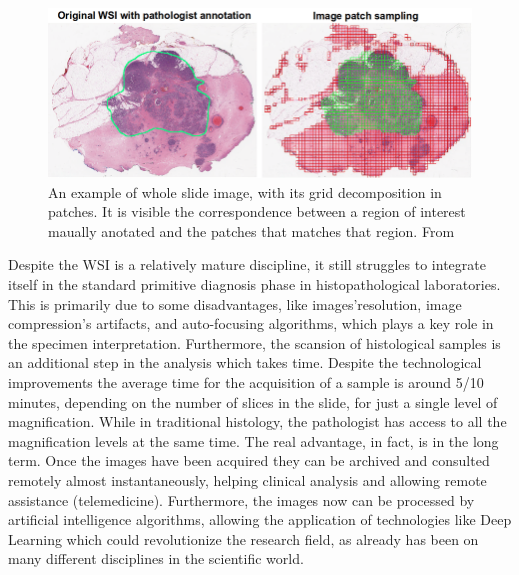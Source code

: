     \begin{figure}
        \centering
        \includegraphics[width = \textwidth]{images/patches_grid}
        \caption{An example of whole slide image, with its grid decomposition in patches. It is visible the correspondence between a region of interest maually anotated and the patches that matches that region. From \cite{WSI_grid}}
        \label{fig:patches_grid}
    \end{figure}

    Despite the WSI is a relatively mature discipline, it still struggles to integrate itself in the standard primitive diagnosis phase in histopathological laboratories. This is primarily due to some disadvantages, like images'resolution, image compression's artifacts, and auto-focusing algorithms, which plays a key role in the specimen interpretation. Furthermore, the scansion of histological samples is an additional step in the analysis which takes time. Despite the technological improvements the average time for the acquisition of a sample is around 5/10 minutes, depending on the number of slices in the slide, for just a single level of magnification. While in traditional histology, the pathologist has access to all the magnification levels at the same time. The real advantage, in fact, is in the long term. Once the images have been acquired they can be archived and consulted remotely almost instantaneously, helping clinical analysis and allowing remote assistance (telemedicine). Furthermore, the images now can be processed by artificial intelligence algorithms, allowing the application of technologies like Deep Learning which could revolutionize the research field, as already has been on many different disciplines in the scientific world.

